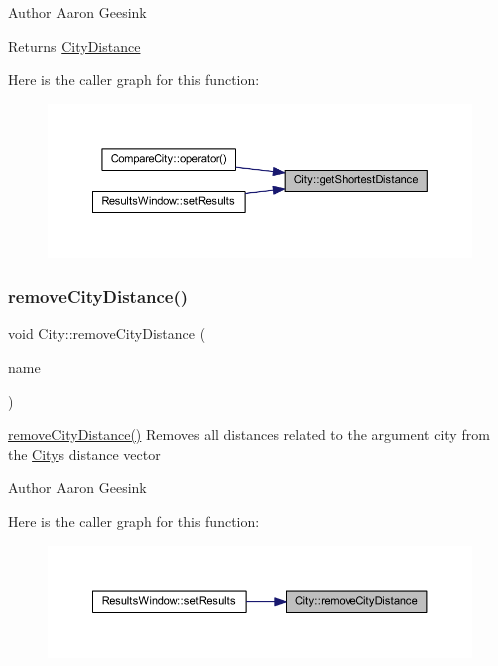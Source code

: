 \begin{DoxyAuthor}{Author}
Aaron Geesink 
\end{DoxyAuthor}
\begin{DoxyReturn}{Returns}
\mbox{\hyperlink{struct_city_distance}{City\+Distance}} 
\end{DoxyReturn}
Here is the caller graph for this function\+:
\nopagebreak
\begin{figure}[H]
\begin{center}
\leavevmode
\includegraphics[width=350pt]{class_city_ad577ecd4be83b37ef2f9c5ff547f5259_icgraph}
\end{center}
\end{figure}
\mbox{\label{class_city_ac4829f9fc09b4c0f4cf2f7453c974264}} 
\subsubsection{\texorpdfstring{removeCityDistance()}{removeCityDistance()}}
{\footnotesize\ttfamily void City\+::remove\+City\+Distance (\begin{DoxyParamCaption}\item[{Q\+String}]{name }\end{DoxyParamCaption})}



\mbox{\hyperlink{class_city_ac4829f9fc09b4c0f4cf2f7453c974264}{remove\+City\+Distance()}} Removes all distances related to the argument city from the \mbox{\hyperlink{class_city}{City}}\textquotesingle{}s distance vector 

\begin{DoxyAuthor}{Author}
Aaron Geesink 
\end{DoxyAuthor}
Here is the caller graph for this function\+:
\nopagebreak
\begin{figure}[H]
\begin{center}
\leavevmode
\includegraphics[width=350pt]{class_city_ac4829f9fc09b4c0f4cf2f7453c974264_icgraph}
\end{center}
\end{figure}
\mbox{\label{class_city_a9fcdb0c59ac7760dd3996803ddb6bf86}} 
